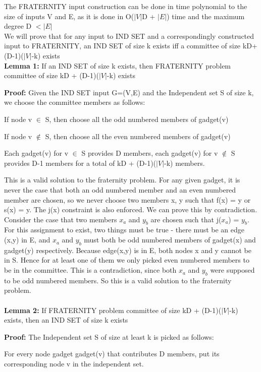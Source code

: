 The FRATERNITY input construction can be done in time polynomial to the size of inputs V and E, as it is done in O($|V|$D + $|E|$) time and the maximum degree D $< |E|$\\

We will prove that for any input to IND SET and a correspondingly constructed input to FRATERNITY, an IND SET of size k exists iff a committee of size kD+(D-1)($|V|$-k) exists
\\

\textbf{Lemma 1:} If an IND SET of size k exists, then FRATERNITY problem committee of size kD + (D-1)($|V|$-k) exists

\textbf{Proof:}
Given the IND SET input G=(V,E) and the Independent set S of size k, we choose the committee members as follows:

If node v $\in$ S, then choose all the odd numbered members of gadget(v)

If node v $\notin$ S, then choose all the even numbered members of gadget(v)

Each gadget(v) for v $\in$ S provides D members, each gadget(v) for v $\notin$ S provides D-1 members for a total of kD + (D-1)($|V|$-k) members.

This is a valid solution to the fraternity problem. For any given gadget, it is never the case that both an odd numbered member and an even numbered member are chosen, so we never choose two members x, y such that f(x) = y or s(x) = y. The j(x) constraint is also enforced. We can prove this by contradiction. Consider the case that two members $x_a$ and $y_b$ are chosen such that j($x_a$) = $y_b$. For this assignment to exist, two things must be true - there must be an edge (x,y) in E, and $x_a$ and $y_b$ must both be odd numbered members of gadget(x) and gadget(y) respectively. Because edge(x,y) is in E, both nodes x and y cannot be in S. Hence for at least one of them we only picked even numbered members to be in the committee. This is a contradiction, since both $x_a$ and $y_b$ were supposed to be odd numbered members. So this is a valid solution to the fraternity problem.\\
\\
\textbf{Lemma 2:} If FRATERNITY problem committee of size kD + (D-1)($|V|$-k) exists, then an IND SET of size k exists

\textbf{Proof:}
The Independent set S of size at least k is picked as follows:

For every node gadget gadget(v) that contributes D members, put its corresponding node v in the independent set.

